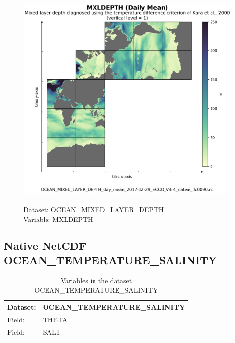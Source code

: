 \begin{figure}[H]
\centering
\includegraphics[scale=0.5]{../images/plots/native_plots/Ocean_Mixed_Layer_Depth/MXLDEPTH.png}
\caption{\\Dataset: OCEAN\_MIXED\_LAYER\_DEPTH\\Variable: MXLDEPTH}
\label{tab:table-OCEAN_MIXED_LAYER_DEPTH_MXLDEPTH-Plot}
\end{figure}
\pagebreak
\subsection{Native NetCDF OCEAN\_TEMPERATURE\_SALINITY}
\newp
\begin{longtable}{|p{}|p{}|}
\caption{Variables in the dataset OCEAN\_TEMPERATURE\_SALINITY}
\label{tab:table-OCEAN_TEMPERATURE_SALINITY-fields} \\ 
\hline \endhead \hline \endfoot
\rowcolor{lightgray} \textbf{Dataset:} & \textbf{OCEAN\_TEMPERATURE\_SALINITY} \\ \hline
Field: &THETA \\ \hline
Field: &SALT \\ \hline
\end{longtable}

\pagebreak
